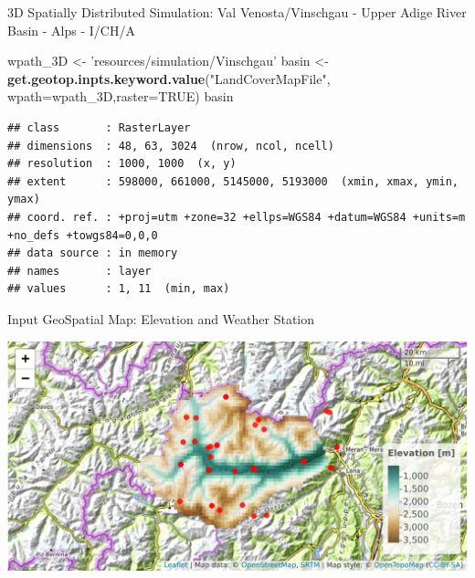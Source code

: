 \documentclass[ignorenonframetext,]{beamer}
\newenvironment{Shaded}{\begin{snugshade}}{\end{snugshade}}
\newcommand{\KeywordTok}[1]{\textcolor[rgb]{0.13,0.29,0.53}{\textbf{#1}}}
\newcommand{\DataTypeTok}[1]{\textcolor[rgb]{0.13,0.29,0.53}{#1}}
\newcommand{\StringTok}[1]{\textcolor[rgb]{0.31,0.60,0.02}{#1}}
\newcommand{\OtherTok}[1]{\textcolor[rgb]{0.56,0.35,0.01}{#1}}
\newcommand{\NormalTok}[1]{#1}
\begin{document}
\begin{frame}[fragile]{3D Spatially Distributed Simulation: Val
Venosta/Vinschgau - Upper Adige River Basin - Alps - I/CH/A}

\begin{Shaded}
\begin{Highlighting}[]
\NormalTok{wpath_3D <-}\StringTok{ 'resources/simulation/Vinschgau'}
\NormalTok{basin <-}\StringTok{ }\KeywordTok{get.geotop.inpts.keyword.value}\NormalTok{(}\StringTok{"LandCoverMapFile"}\NormalTok{,}
              \DataTypeTok{wpath=}\NormalTok{wpath_3D,}\DataTypeTok{raster=}\OtherTok{TRUE}\NormalTok{)}
\NormalTok{basin}
\end{Highlighting}
\end{Shaded}

\begin{verbatim}
## class       : RasterLayer 
## dimensions  : 48, 63, 3024  (nrow, ncol, ncell)
## resolution  : 1000, 1000  (x, y)
## extent      : 598000, 661000, 5145000, 5193000  (xmin, xmax, ymin, ymax)
## coord. ref. : +proj=utm +zone=32 +ellps=WGS84 +datum=WGS84 +units=m +no_defs +towgs84=0,0,0 
## data source : in memory
## names       : layer 
## values      : 1, 11  (min, max)
\end{verbatim}

\end{frame}

\begin{frame}{Input GeoSpatial Map: Elevation and Weather Station}

\includegraphics{presentation_files/figure-beamer/unnamed-chunk-12-1.pdf}

\end{frame}
\end{document}
